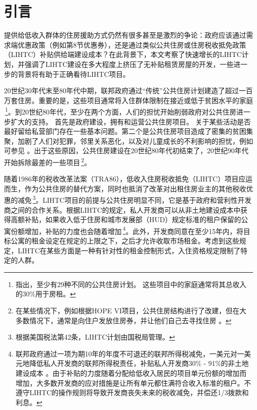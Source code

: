 \documentclass[lang=cn,11pt,a4paper]{paper}
\begin{document}
\section{引言}

提供给低收入群体的住房援助方式仍然有很多甚至是激烈的争论：政府应该通过需求端优惠政策（例如第8节优惠券），还是通过类似公共住房或住房税收抵免政策（LIHTC）补贴供给端建设成本？在此背景下，本文考察了快速增长的LIHTC计划，并强调了LIHTC建设在多大程度上挤压了无补贴租赁房屋的开发，一些进一步的背景将有助于正确看待LIHTC项目。

20世纪30年代末至80年代中期，联邦政府通过“传统”公共住房计划建造了超过一百万套住房。重要的是，这些项目通常将入住群体限制在接近或低于贫困水平的家庭 \citep{Olsen2003365}\,\footnote{\cite{Olsen2003365}指出，至少有29种不同的公共住房计划。 这些项目中的家庭通常将其总收入的30\%用于房租。}。到20世纪80年代，至少在两个方面，人们的担忧开始削弱政府对公共住房进一步扩大的支持。 首先是政府建设，拥有和运营公共住房项目。 关于某些活动是否最好留给私营部门存在一些基本问题。第二个是公共住房项目造成了密集的贫困集聚，加剧了人们对犯罪，邻里关系恶化，以及对儿童成长的不利影响的担忧，例如可参见 \cite{Currie200099,Jencks1990111}。出于这些原因，公共住房建设在20世纪80年代初结束了，20世纪90年代开始拆除最差的一些项目\,\footnote{在某些情况下，例如根据HOPE VI项目，公共住房结构进行了改建，但在大多数情况下，通常是向住户发放住房券，并让他们自己去寻找住房 \citep{Jacob2004233}。}。

随着1986年的税收改革法案（TRA86），低收入住房税收抵免（LIHTC）项目应运而生，作为公共住房的替代方案，同时也抵消了改革对出租住房业主的其他税收优惠的减免\citep{USCongress1987}\,\footnote{根据美国税法第42条，LIHTC计划由国税局管理。}。LIHTC项目的前提与公共住房明显不同，它是基于政府和营利性开发商之间的合作关系。根据LIHTC的规定，私人开发商可以从非土地建设成本中获得高额补贴，如果收入低于住房和城市发展部（HUD）规定标准的租户保留的公寓份额增加，补贴的力度也会随着增加\,\footnote{联邦政府通过一项为期10年的年度不可退还的联邦所得税减免，一美元对一美元地降低私人开发商的联邦所得税责任，补贴私人开发商30\% - 91\%的非土地建设成本 \cite{Eriksen2009141}。由于补贴的力度随着分配给低收入居民的项目单元份额的增加而增加，大多数开发商的应对措施是让所有单元都住满符合收入标准的租户。不遵守LIHTC的操作规则将导致开发商丧失未来的税收减免，并偿还1/3拨款和利息。}。此外，开发商同意在至少15年内，将目标公寓的租金设定在规定的上限之下，之后才允许收取市场租金。考虑到这些规定，LIHTC在某些方面是一种有针对性的租金控制形式，入住资格规定限制了特定的人群。
\end{document}
